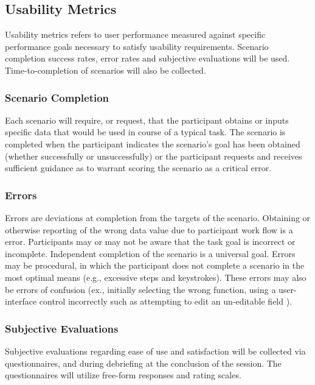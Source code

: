 \documentclass[10pt]{article}
\begin{document}
\begin{multicols}{2}
\subsection*{Usability Metrics}
Usability metrics refers to user performance measured against specific performance goals necessary to satisfy usability requirements. Scenario completion success rates, error rates and subjective evaluations will be used. Time-to-completion of scenarios will also be collected.\\

\subsubsection*{Scenario Completion}
Each scenario will require, or request, that the participant obtains or inputs specific data that would be used in course of a typical task. The scenario is completed when the participant indicates the scenario's goal has been obtained (whether successfully or unsuccessfully) or the participant requests and receives sufficient guidance as to warrant scoring the scenario as a critical error.\\

\subsubsection*{Errors}
Errors are deviations at completion from the targets of the scenario. Obtaining or otherwise reporting of the wrong data value due to participant work flow is a error. Participants may or may not be aware that the task goal is incorrect or incomplete.
Independent completion of the scenario is a universal goal. Errors may be procedural, in which the participant does not complete a scenario in the most optimal means (e.g., excessive steps and keystrokes). These errors may also be errors of confusion (ex., initially selecting the wrong function, using a user-interface control incorrectly such as attempting to edit an un-editable field ).\\

\subsubsection*{Subjective Evaluations}
Subjective evaluations regarding ease of use and satisfaction will be collected via questionnaires, and during debriefing at the conclusion of the session. The questionnaires will utilize free-form responses and rating scales.\\


\end{multicols}
\end{document}
